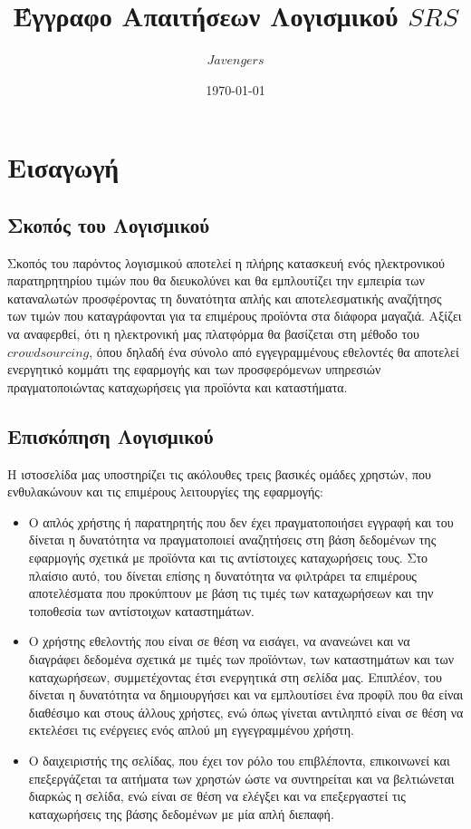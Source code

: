\documentclass[12pt]{article}
\begin{document}
\title{Έγγραφο Απαιτήσεων Λογισμικού $SRS$}
\date{\today}
\author{$Javengers$}

\maketitle

\tableofcontents

\section{Εισαγωγή}

\subsection{Σκοπός του Λογισμικού}

Σκοπός του παρόντος λογισμικού αποτελεί η πλήρης κατασκευή ενός ηλεκτρονικού παρατηρητηρίου τιμών που θα διευκολύνει και θα εμπλουτίζει την εμπειρία των καταναλωτών προσφέροντας τη δυνατότητα απλής και αποτελεσματικής αναζήτησς των τιμών που καταγράφονται για τα επιμέρους προϊόντα στα διάφορα μαγαζιά. Αξίζει να αναφερθεί, ότι η ηλεκτρονική μας πλατφόρμα θα βασίζεται στη μέθοδο του $crowdsourcing$, όπου δηλαδή ένα σύνολο από εγγεγραμμένους εθελοντές θα αποτελεί ενεργητικό κομμάτι της εφαρμογής και των προσφερόμενων υπηρεσιών πραγματοποιώντας καταχωρήσεις για προϊόντα και καταστήματα.

\subsection{Επισκόπηση Λογισμικού}

Η ιστοσελίδα μας υποστηρίζει τις ακόλουθες τρεις βασικές ομάδες χρηστών, που ενθυλακώνουν και τις επιμέρους λειτουργίες της εφαρμογής:
\begin{itemize}
\item Ο απλός χρήστης ή παρατηρητής που δεν έχει πραγματοποιήσει εγγραφή και του δίνεται η δυνατότητα να πραγματοποιεί αναζητήσεις στη βάση δεδομένων της εφαρμογής σχετικά με προϊόντα και τις αντίστοιχες καταχωρήσεις τους. Στο πλαίσιο αυτό, του δίνεται επίσης η δυνατότητα να φιλτράρει τα επιμέρους αποτελέσματα που προκύπτουν με βάση τις τιμές των καταχωρήσεων και την τοποθεσία των αντίστοιχων καταστημάτων.
\item Ο χρήστης εθελοντής που είναι σε θέση να εισάγει, να ανανεώνει και να διαγράφει δεδομένα σχετικά με τιμές των προϊόντων, των καταστημάτων και των καταχωρήσεων, συμμετέχοντας έτσι ενεργητικά στη σελίδα μας. Επιπλέον, του δίνεται η δυνατότητα να δημιουργήσει και να εμπλουτίσει ένα προφίλ που θα είναι διαθέσιμο και στους άλλους χρήστες, ενώ όπως γίνεται αντιληπτό είναι σε θέση να εκτελέσει τις ενέργειες ενός απλού μη εγγεγραμμένου χρήστη.
\item Ο δαιχειριστής της σελίδας, που έχει τον ρόλο του επιβλέποντα, επικοινωνεί και επεξεργάζεται τα αιτήματα των χρηστών ώστε να συντηρείται και να βελτιώνεται διαρκώς η σελίδα, ενώ είναι σε θέση να ελέγξει και να επεξεργαστεί τις καταχωρήσεις της βάσης δεδομένων με μία απλή διεπαφή. 
\end{itemize}
\end{document}
